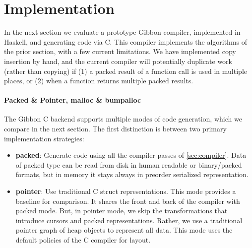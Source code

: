 \documentclass[a4paper,english]{lipics-v2016}
\newcommand{\treelang}{Gibbon\xspace} %
\begin{document}




\section{Implementation}\label{sec:impl}

In the next section we evaluate a prototype \treelang compiler, implemented in
Haskell, and generating code via C. 
%
This compiler implements the algorithms of the prior section, with a few current
limitations.  We have implemented copy insertion by hand, and the current compiler
will potentially duplicate work (rather than copying) if (1) a packed result of a
function call is used in multiple places, or (2) when a function returns multiple
packed results.

\paragraph*{Packed \& Pointer, malloc \& bumpalloc}\label{sec:packed-pointer}

The \treelang C backend supports multiple modes of code generation, which we
compare in the next section.  The first distinction is between two primary
implementation strategies:

\begin{itemize}
\item {\bf packed}: Generate code using all the compiler passes of
  \cref{sec:compiler}.  Data of packed type can be read from disk in human
  readable or binary/packed formats, but in memory it stays always in preorder
  serialized representation.
\item {\bf pointer}: Use traditional C struct representations.  This mode
  provides a baseline for comparison.  It shares the front and back of the
  compiler with packed mode.  But, in pointer mode, we skip the transformations
  that introduce cursors and packed representations.  Rather, we use a
  traditional pointer graph of heap objects to represent all data.  This mode uses the
  default policies of the C compiler for  layout.
\end{itemize}
\end{document}
